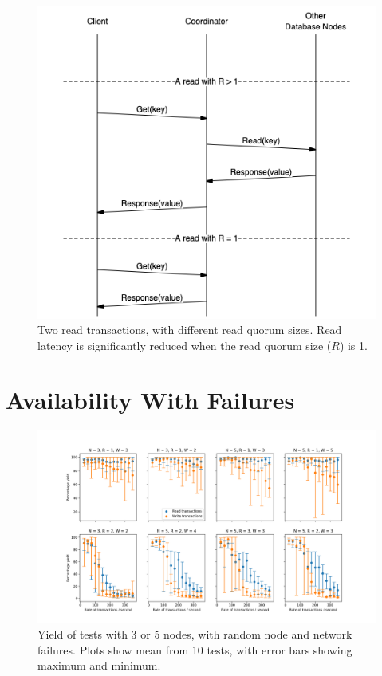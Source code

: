 \documentclass[12pt,a4paper,twoside,openany]{report}
\begin{document}
\begin{figure}[ht]
\centerline{\includegraphics[width=\linewidth]{figs/r1.png}}
\caption{Two read transactions, with different read quorum sizes. Read latency is significantly reduced when the read quorum size ($R$) is 1.}
\label{r1}
\end{figure}

\section{Availability With Failures}

\begin{figure}[ht!]
\centerline{\includegraphics[width=\paperwidth]{figs/eval-fig-2.png}}
\caption{Yield of tests with 3 or 5 nodes, with random node and network failures. Plots show mean from 10 tests, with error bars showing maximum and minimum.}
\label{yield35normal}
\end{figure}
\end{document}
